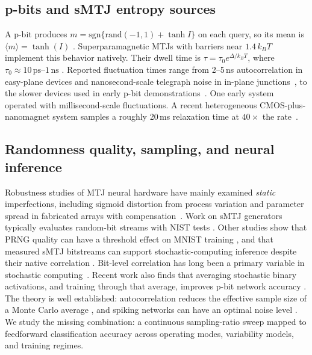 \documentclass[journal]{IEEEtran}
\begin{document}
\subsection{p-bits and sMTJ entropy sources}
A p-bit produces $m=\mathrm{sgn}\{\mathrm{rand}(-1,1)+\tanh I\}$ on each
query, so its mean is $\langle m\rangle=\tanh(I)$
\cite{camsari2017stochastic}. Superparamagnetic MTJs with barriers near
$1.4\,k_BT$~\cite{sun2026superparamagnetic} implement this behavior
natively. Their dwell time is $\tau=\tau_0e^{\Delta/k_BT}$, where
$\tau_0\approx10\,\mathrm{ps}$--$1\,\mathrm{ns}$
\cite{camsari2017stochastic}. Reported fluctuation times range from
2--5\,ns autocorrelation in easy-plane devices
\cite{safranski2021nanosecond} and nanosecond-scale telegraph noise in
in-plane junctions~\cite{hayakawa2021nanosecond}, to the slower devices
used in early p-bit demonstrations~\cite{borders2019integer}. One early
system operated with millisecond-scale fluctuations. A recent heterogeneous
CMOS-plus-nanomagnet system samples a roughly 20\,ms relaxation time at
$40\times$ the rate~\cite{singh2024cmos}.

\subsection{Randomness quality, sampling, and neural inference}
Robustness studies of MTJ neural hardware have mainly examined \emph{static}
imperfections, including sigmoid distortion from process variation
\cite{wood2020modular,zand2018composable} and parameter spread in fabricated
arrays with compensation~\cite{zhang2025automatic}. Work on sMTJ generators
typically evaluates random-bit streams with NIST tests
\cite{vodenicarevic2017low,sun2026superparamagnetic}. Other studies show
that PRNG quality can have a threshold effect on MNIST training
\cite{prng2025quality}, and that measured sMTJ bitstreams can support
stochastic-computing inference despite their native correlation
\cite{spintronicSC2025}. Bit-level correlation has long been a primary
variable in stochastic computing~\cite{alaghi2013survey,alaghi2013exploiting}.
Recent work also finds that averaging stochastic binary activations, and
training through that average, improves p-bit network accuracy
\cite{ghantasala2026sampling}. The theory is well established:
autocorrelation reduces the effective sample size of a Monte Carlo average
\cite{sokal1997monte}, and spiking networks can have an optimal noise level
\cite{timcheck2022optimal}. We study the missing combination: a continuous
sampling-ratio sweep mapped to feedforward classification accuracy across
operating modes, variability models, and training regimes.
\end{document}
